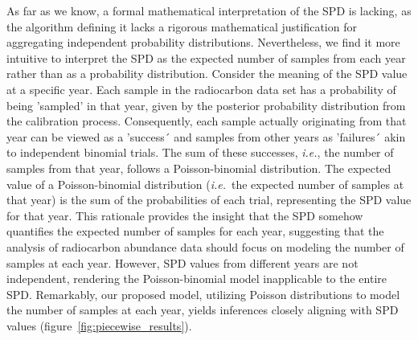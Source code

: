 \documentclass[a4paper]{article}
\begin{document}
As far as we know, a formal mathematical interpretation of the SPD is lacking, as the algorithm defining it lacks a rigorous mathematical justification for aggregating independent probability distributions. Nevertheless, we find it more intuitive to interpret the SPD as the expected number of samples from each year rather than as a probability distribution. Consider the meaning of the SPD value at a specific year. Each sample in the radiocarbon data set has a probability of being 'sampled' in that year, given by the posterior probability distribution from the calibration process. Consequently, each sample actually originating from that year can be viewed as a 'success´ and samples from other years as 'failures´ akin to independent binomial trials. The sum of these successes, \emph{i.e.}, the number of samples from that year, follows a Poisson-binomial distribution. The expected value of a Poisson-binomial distribution (\emph{i.e.}\ the expected number of samples at that year) is the sum of the probabilities of each trial, representing the SPD value for that year. This rationale provides the insight that the SPD somehow quantifies the expected number of samples for each year, suggesting that the analysis of radiocarbon abundance data should focus on modeling the number of samples at each year. However, SPD values from different years are not independent, rendering the Poisson-binomial model inapplicable to the entire SPD. Remarkably, our proposed model, utilizing Poisson distributions to model the number of samples at each year, yields inferences closely aligning with SPD values (figure~\ref{fig:piecewise_results}).
\\
\end{document}
